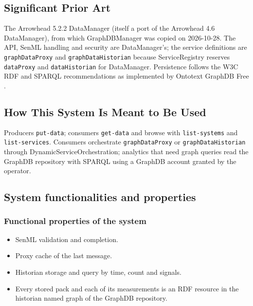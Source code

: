 \documentclass[a4paper]{arrowhead}
\begin{document}
\newpage

\subsection{Significant Prior Art}
\label{sec:prior_art}

The Arrowhead 5.2.2 DataManager \cite{dm-sysd-ref} (itself a port of the Arrowhead 4.6 DataManager), from which GraphDBManager was copied on 2026-10-28. The API, SenML handling and security are DataManager's; the service definitions are \texttt{graphDataProxy} and \texttt{graphDataHistorian} because ServiceRegistry reserves \texttt{dataProxy} and \texttt{dataHistorian} for DataManager. Persistence follows the W3C RDF and SPARQL recommendations \cite{rdf11,sparql11} as implemented by Ontotext GraphDB Free \cite{graphdb}.

\subsection{How This System Is Meant to Be Used}
\label{sec:use}

Producers \texttt{put-\allowbreak{}data}; consumers \texttt{get-\allowbreak{}data} and browse with \texttt{list-\allowbreak{}systems} and \texttt{list-\allowbreak{}services}. Consumers orchestrate \texttt{graphDataProxy} or \texttt{graphDataHistorian} through DynamicServiceOrchestration; analytics that need graph queries read the GraphDB repository with SPARQL using a GraphDB account granted by the operator.

\subsection{System functionalities and properties}
\label{sec:properties}

\subsubsection{Functional properties of the system}

\begin{itemize}
  \item SenML validation and completion.
  \item Proxy cache of the last message.
  \item Historian storage and query by time, count and signals.
  \item Every stored pack and each of its measurements is an RDF resource in the historian named graph of the GraphDB repository.
\end{itemize}
\end{document}
